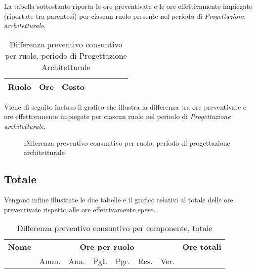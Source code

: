 La tabella sottostante riporta le ore preventivate e le ore effettivamente impiegate (riportate tra parentesi) per ciascun ruolo presente nel periodo di \textit{Progettazione architetturale}.

\begin{table}[H]
\centering
\begin{tabular}{lccccccc}
\toprule
    \textbf{Ruolo}  & \textbf{Ore} & \textbf{Costo} \\
    \midrule
    
    	
    
    \bottomrule
\end{tabular}
\caption{Differenza preventivo consuntivo per ruolo, periodo di Progettazione Architetturale}
\end{table}

Viene di seguito incluso il grafico che illustra la differenza tra ore preventivate e ore effettivamente impiegate per ciascun ruolo nel periodo di \textit{Progettazione architetturale}.

\begin{figure}[H]
\centering
{}
\caption{Differenza preventivo consuntivo per ruolo, periodo di progettazione architetturale}
\end{figure}

\subsection{Totale}

Vengono infine illustrate le due tabelle e il grafico relativi al totale delle ore preventivate rispetto alle ore effettivamente spese.

\begin{center}
\begin{table}[H]
\begin{tabular}{lccccccc}
\toprule
    \textbf{Nome}  & \multicolumn{6}{c}{\textbf{Ore per ruolo}} & \textbf{Ore totali} \\
     & Amm. & Ana. & Pgt. & Pgr. & Res. & Ver. & \\
    \midrule
    
    	
    
    \bottomrule
\end{tabular}
\caption{Differenza preventivo consuntivo per componente, totale}
\end{table}
\end{center}

